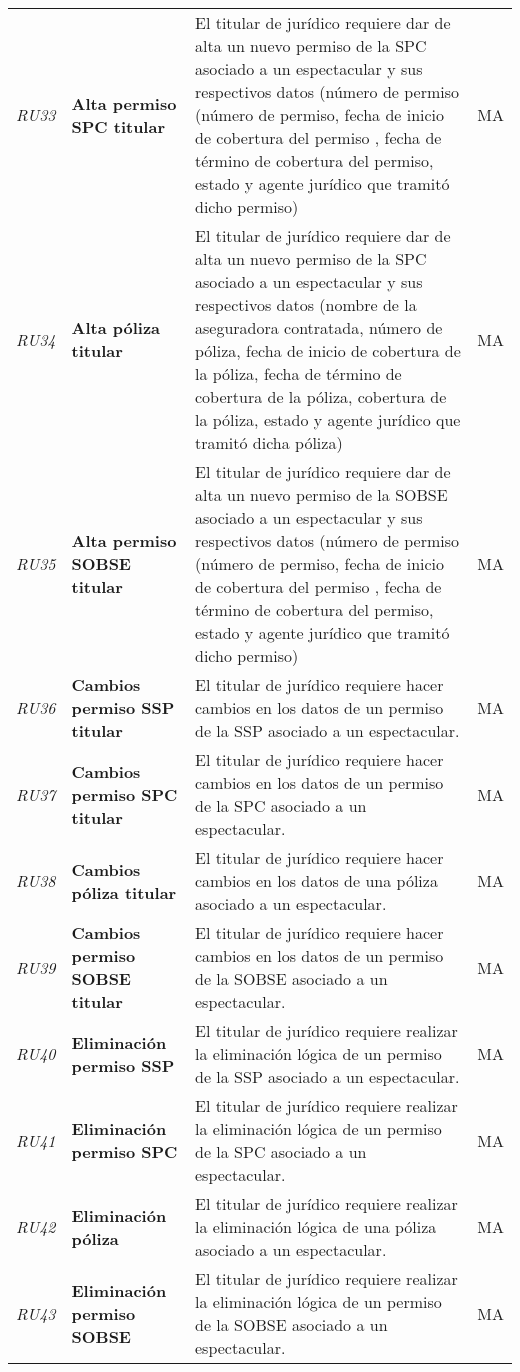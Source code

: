 \begin{longtable}[H]{m{2cm}m{3cm}m{5cm}m{2cm}}
\textit{RU33} &\textbf{Alta permiso SPC titular} & El titular de jurídico requiere dar de alta un nuevo permiso de la SPC asociado a un espectacular y sus respectivos datos (número de permiso (número de permiso, fecha de inicio de cobertura del permiso , fecha de término de cobertura del permiso, estado y agente jurídico que tramitó dicho permiso) & MA\tabularnewline
\textit{RU34} &\textbf{Alta póliza titular} & El titular de jurídico requiere dar de alta un nuevo permiso de la SPC asociado a un espectacular y sus respectivos datos (nombre de la aseguradora contratada, número de póliza, fecha de inicio de cobertura de la póliza, fecha de término de cobertura de la póliza, cobertura de la póliza, estado y agente jurídico que tramitó dicha póliza) & MA\tabularnewline
\textit{RU35} &\textbf{Alta permiso SOBSE titular} & El titular de jurídico requiere dar de alta un nuevo permiso de la SOBSE asociado a un espectacular y sus respectivos datos (número de permiso (número de permiso, fecha de inicio de cobertura del permiso , fecha de término de cobertura del permiso, estado y agente jurídico que tramitó dicho permiso) & MA\tabularnewline
\textit{RU36} &\textbf{Cambios permiso SSP titular} & El titular de jurídico requiere hacer cambios en los datos de un permiso de la SSP asociado a un espectacular. & MA\tabularnewline
\textit{RU37} &\textbf{Cambios permiso SPC titular} & El titular de jurídico requiere hacer cambios en los datos de un permiso de la SPC asociado a un espectacular. & MA\tabularnewline
\textit{RU38} &\textbf{Cambios póliza titular} & El titular de jurídico requiere hacer cambios en los datos de una póliza asociado a un espectacular. & MA\tabularnewline
\textit{RU39} &\textbf{Cambios permiso SOBSE titular} & El titular de jurídico requiere hacer cambios en los datos de un permiso de la SOBSE asociado a un espectacular. & MA\tabularnewline
\textit{RU40} &\textbf{Eliminación permiso SSP} & El titular de jurídico requiere realizar la eliminación lógica de un permiso de la SSP asociado a un espectacular. & MA\tabularnewline
\textit{RU41} &\textbf{Eliminación permiso SPC} & El titular de jurídico requiere realizar la eliminación lógica de un permiso de la SPC asociado a un espectacular. & MA\tabularnewline
\textit{RU42} &\textbf{Eliminación póliza} & El titular de jurídico requiere realizar la eliminación lógica de una póliza asociado a un espectacular. & MA\tabularnewline
\textit{RU43} &\textbf{Eliminación permiso SOBSE} & El titular de jurídico requiere realizar la eliminación lógica de un permiso de la SOBSE asociado a un espectacular. & MA\tabularnewline

\end{longtable}
